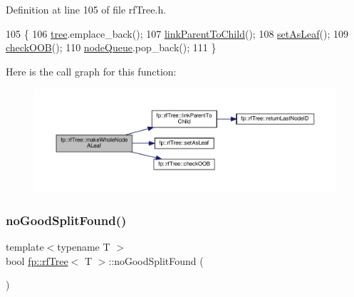 Definition at line 105 of file rf\+Tree.\+h.


\begin{DoxyCode}
105                                                 \{
106                     \hyperlink{classtree}{tree}.emplace\_back();
107                     \hyperlink{classfp_1_1rfTree_aceaedc5d54bb429c1a3539f164a93d45}{linkParentToChild}();
108                     \hyperlink{classfp_1_1rfTree_a3583e1f1659ba9a9013a4891709bacb9}{setAsLeaf}();
109                     \hyperlink{classfp_1_1rfTree_a45e47b318c90a1359840ab6161f20ab1}{checkOOB}();
110                     \hyperlink{classfp_1_1rfTree_af72d0a2f930fd480dfb4858885c2df23}{nodeQueue}.pop\_back();
111                 \}
\end{DoxyCode}
Here is the call graph for this function\+:
\nopagebreak
\begin{figure}[H]
\begin{center}
\leavevmode
\includegraphics[width=350pt]{classfp_1_1rfTree_a2b2a47186c0784415609f1c9b005e702_cgraph}
\end{center}
\end{figure}
\mbox{\label{classfp_1_1rfTree_a618bdc2d22267b4bb4f5e1881b1788f6}} 
\subsubsection{\texorpdfstring{no\+Good\+Split\+Found()}{noGoodSplitFound()}\hspace{0.1cm}{\footnotesize\ttfamily [1/2]}}
{\footnotesize\ttfamily template$<$typename T $>$ \\
bool \hyperlink{classfp_1_1rfTree}{fp\+::rf\+Tree}$<$ T $>$\+::no\+Good\+Split\+Found (\begin{DoxyParamCaption}{ }\end{DoxyParamCaption})\hspace{0.3cm}{\ttfamily [inline]}}



